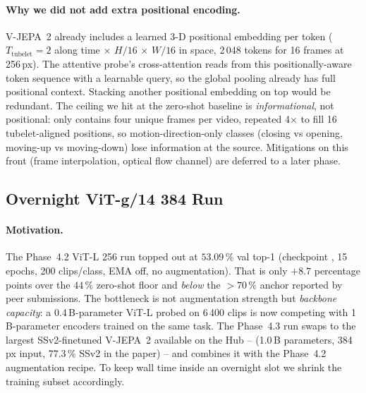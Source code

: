 \paragraph{Why we did not add extra positional encoding.}
V-JEPA~2 already includes a learned 3-D positional embedding per token
(\(T_{\text{tubelet}}{=}2\) along time \(\times\) \(H/16\,\times\,W/16\)
in space, 2\,048 tokens for 16 frames at 256\,px). The attentive
probe's cross-attention reads from this positionally-aware token
sequence with a learnable query, so the global pooling already has
full positional context. Stacking another positional embedding on top
would be redundant. The ceiling we hit at the zero-shot baseline is
\emph{informational}, not positional:  only contains
four unique frames per video, repeated 4\(\times\) to fill 16
tubelet-aligned positions, so motion-direction-only classes (closing
vs opening, moving-up vs moving-down) lose information at the source.
Mitigations on this front (frame interpolation, optical flow channel)
are deferred to a later phase.

\subsection{Overnight ViT-g/14 384 Run}
\label{sec:trackb-vitg384}

\paragraph{Motivation.}
The Phase~4.2 ViT-L 256 run topped out at \(53.09\,\%\) val top-1
(checkpoint , 15
epochs, 200 clips/class, EMA off, no augmentation). That is only
\(+8.7\) percentage points over the \(44\,\%\) zero-shot floor and
\emph{below} the \(>70\,\%\) anchor reported by peer submissions. The
bottleneck is not augmentation strength but \emph{backbone capacity}:
a 0.4\,B-parameter ViT-L probed on 6\,400 clips is now competing with
1\,B-parameter encoders trained on the same task. The Phase~4.3 run
swaps to the largest SSv2-finetuned V-JEPA~2 available on the Hub --
 (1.0\,B parameters, 384\,px
input, \(77.3\,\%\) SSv2 in the paper) -- and combines it with the
Phase~4.2 augmentation recipe. To keep wall time inside an overnight
slot we shrink the training subset accordingly.

